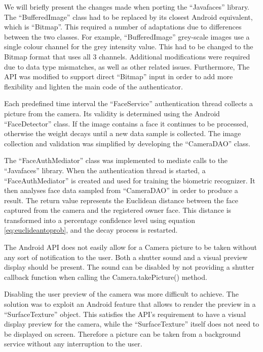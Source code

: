 We will briefly present the changes made when porting the ``Javafaces'' library. The ``BufferedImage'' class had to be replaced by its closest Android equivalent, which is ``Bitmap''. This required a number of adaptations due to differences between the two classes. For example, ``BufferedImage'' grey-scale images use a single colour channel for the grey intensity value. This had to be changed to the Bitmap format that uses all 3 channels. Additional modifications were required due to data type mismatches, as well as other related issues. Furthermore, The API was modified to support direct ``Bitmap'' input in order to add more flexibility and lighten the main code of the authenticator. 

Each predefined time interval the ``FaceService'' authentication thread collects a picture from the camera. Its validity is determined using the Android ``FaceDetector'' class. If the image contains a face it continues to be processed, otherwise the weight decays until a new data sample is collected. The image collection and validation was simplified by developing the ``CameraDAO'' class.

The ``FaceAuthMediator'' class was implemented to mediate calls to the ``Javafaces'' library. When the authentication thread is started, a ``FaceAuthMediator'' is created and used for training the biometric recognizer. It then analyses face data sampled from ``CameraDAO'' in order to produce a result. The return value represents the Euclidean distance between the face captured from the camera and the registered owner face. This distance is transformed into a percentage confidence level using equation \ref{eq:euclideantoprob}, and the decay process is restarted.  

The Android API does not easily allow for a Camera picture to be taken without any sort of notification to the user. Both a shutter sound and a visual preview display should be present. The sound can be disabled by not providing a shutter callback function when calling the Camera.takePicture() method. 

Disabling the user preview of the camera was more difficult to achieve. The solution was to exploit an Android feature that allows to render the preview in a ``SurfaceTexture'' object. This satisfies the API's requirement to have a visual display preview for the camera, while the ``SurfaceTexture'' itself does not need to be displayed on screen. Therefore a picture can be taken from a background service without any interruption to the user.

